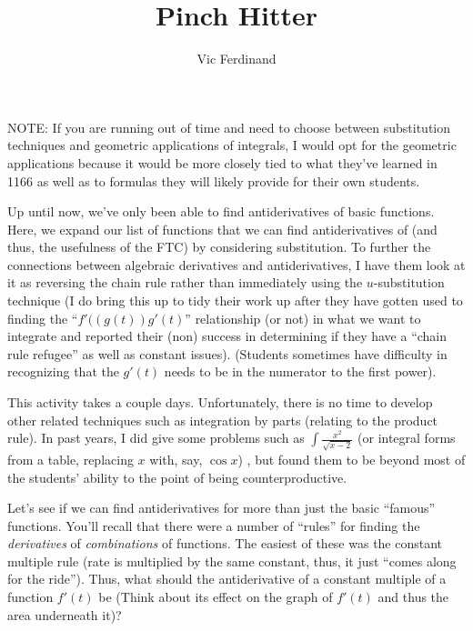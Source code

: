 \documentclass{ximera}
\title{Pinch Hitter}
\author{Vic Ferdinand}
\begin{document}
\begin{abstract}
\end{abstract}
\maketitle


\begin{instructorIntro}
NOTE: If you are running out of time and need to choose between substitution techniques and geometric applications of integrals, I would opt for the geometric applications because it would be more closely tied to what they've learned in 1166 as well as to formulas they will likely provide for their own students.

Up until now, we've only been able to find antiderivatives of basic functions.  Here, we expand our list of functions that we can find antiderivatives of (and thus, the usefulness of the FTC) by considering substitution.  To further the connections between algebraic derivatives and antiderivatives, I have them look at it as reversing the chain rule rather than immediately using the $u$-substitution technique (I do bring this up to tidy their work up after they have gotten used to finding the ``$f'((g(t))g'(t)$'' relationship (or not) in what we want to integrate and reported their (non) success in determining if they have a ``chain rule refugee'' as well as constant issues).  (Students sometimes have difficulty in recognizing that the $g'(t)$ needs to be in the numerator to the first power).

This activity takes a couple days.   Unfortunately, there is no time to develop other related techniques such as integration by parts (relating to the product rule).  In past years, I did give some problems such as $\int \frac{x^2}{\sqrt{x-2}}$ (or integral forms from a table, replacing $x$ with, say, $\cos x$) , but found them to be beyond most of the students' ability to the point of being counterproductive.

\end{instructorIntro}

Let's see if we can find antiderivatives for more than just the basic ``famous'' functions.  You’ll recall that there were a number of ``rules'' for finding the {\em derivatives} of {\em combinations} of functions.  The easiest of these was the constant multiple rule (rate is multiplied by the same constant, thus, it just ``comes along for the ride'').  Thus, what should the antiderivative of a constant multiple of a function $f'(t)$ be (Think about its effect on the graph of $f'(t)$ and thus the area underneath it)?
\end{document}
